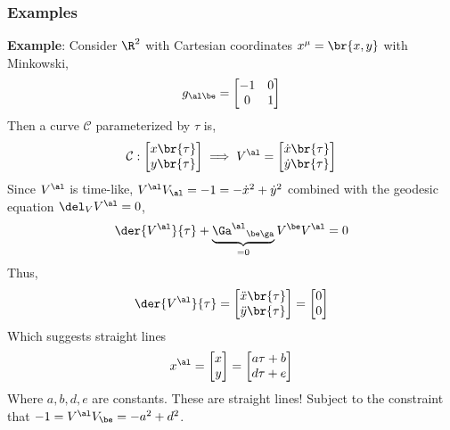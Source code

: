 \documentclass{article}
\newcommand{\mtrx}[1]{
    \begin{bmatrix}
    #1
    \end{bmatrix}
}
\begin{document}
\subsubsection{Examples}
\textbf{Example}: Consider $\R^2$ with Cartesian coordinates $x^\mu = \br{x,y}$ with Minkowski,
\[ g_{\al\be} = \mtrx{-1 & 0 \\ 0 & 1} \]
Then a curve $\mathcal{C}$ parameterized by $\tau$ is,
\[ \mathcal{C} : \mtrx{x\br{\tau} \\ y\br{\tau}} \implies V^\al = \mtrx{\dot{x}\br{\tau} \\ \dot{y}\br{\tau}} \]
Since $V^\al$ is time-like, $V^\al V_\al = -1 = -\dot{x}^2 + \dot{y}^2$ combined with the geodesic equation $\del_VV^\al = 0$,
\[ \der{V^\al}{\tau} + \underbrace{{\Ga^\al}_{\be\ga}}_{=0} V^\be V^\al = 0 \]
Thus,
\[ \der{V^\al}{\tau} = \mtrx{\ddot{x}\br{\tau} \\ \ddot{y}\br{\tau}} = \mtrx{0 \\ 0}\]
Which suggests straight lines
\[ x^\al = \mtrx{x \\ y} = \mtrx{a\tau + b \\ d \tau + e}\]
Where $a,b,d,e$ are constants. These are straight lines! Subject to the constraint that $-1 = V^\al V_\be = -a^2 + d^2$. \\
\end{document}
